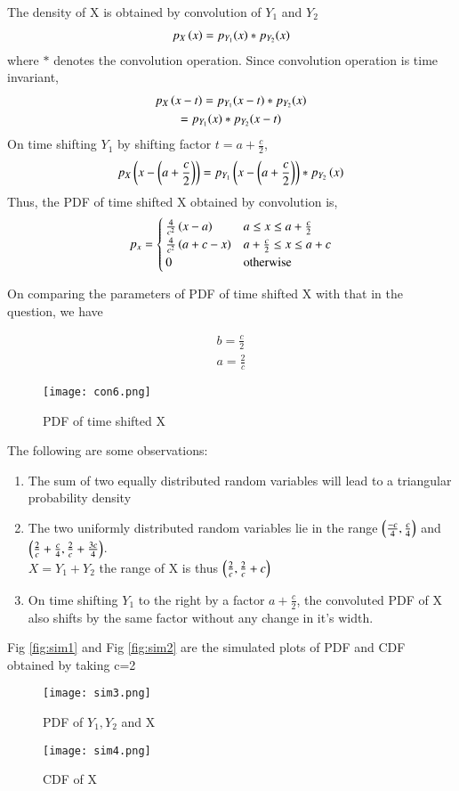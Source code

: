 \documentclass[journal,12pt,twocolumn]{IEEEtran}
\begin{document}
The density of X is obtained by convolution of $Y_1$ and $Y_2$
\begin{align}
p_X\left(x\right) = p_{Y_1}(x)*p_{Y_2}(x)
\end{align}
where $*$ denotes the convolution operation. Since convolution operation is time invariant, 
\begin{multline}
    p_X\left(x-t\right) = p_{Y_1}(x-t)*p_{Y_2}(x) \\ = p_{Y_1}(x)*p_{Y_2}(x-t)
\end{multline}
On time shifting $Y_1$ by shifting factor $t=a+\frac{c}{2}$, 
\begin{align}
    p_X\left(x-\left(a+\frac{c}{2}\right)\right) =  p_{Y_1}\left(x-\left(a+\frac{c}{2}\right)\right)*p_{Y_2}\left(x\right)
\end{align}
Thus, the PDF of time shifted X obtained by convolution is,
\begin{align}
p_x = 
\begin{cases}
\frac{4}{c^2}\left(x-a\right) & a \le x \le a+\frac{c}{2}\\
\frac{4}{c^2}\left(a+c-x\right) & a+\frac{c}{2} \le x \le a+c \\
0 & \text{otherwise}
\end{cases}
\end{align}

On comparing the parameters of PDF of time shifted X with that in the question, we have

\begin{align}
    b=\frac{c}{2}\\
    a=\frac{2}{c}
\end{align}


\begin{figure}[H]
\centering
\texttt{[image: con6.png]}
\caption{PDF of time shifted X}
\label{fig:convolution}
\end{figure}
The following are some observations: 
\begin{enumerate}
    \item The sum of two equally distributed random variables will lead to a triangular probability density
    \item The two uniformly distributed random variables lie in the range $\left(\frac{-c}{4},\frac{c}{4}\right)$ and $\left(\frac{2}{c}+\frac{c}{4} , \frac{2}{c}+\frac{3c}{4}\right)$. \\
    \because $X = Y_1 + Y_2$ the range of X is thus $\left(\frac{2}{c},\frac{2}{c}+c\right)$
    \item On time shifting $Y_1$ to the right by a factor $a+\frac{c}{2}$, the convoluted PDF of X also shifts by the same factor without any change in it's width.
\end{enumerate}

Fig \ref{fig:sim1} and Fig \ref{fig:sim2} are the simulated plots of PDF and CDF obtained by taking c=2
\begin{figure}[h!]
\centering
\texttt{[image: sim3.png]}
\caption{PDF of $Y_1, Y_2$ and X}
\label{fig:sim3}
\end{figure}
\begin{figure}[H]
\centering
\texttt{[image: sim4.png]}
\caption{CDF of X}
\label{fig:sim4}
\end{figure}
\end{document}
